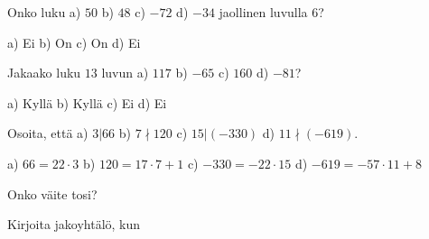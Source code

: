 \begin{tehtavasivu}

\begin{tehtava}
    Onko luku a) $50$ b) $48$ c) $-72$ d) $-34$ jaollinen luvulla $6$?
    \begin{vastaus}
        a) Ei b) On c) On d) Ei
    \end{vastaus}

\end{tehtava}

\begin{tehtava}
    Jakaako luku $13$ luvun a) $117$ b) $-65$ c) $160$ d) $-81$?
    \begin{vastaus}
        a) Kyllä b) Kyllä c) Ei d) Ei 
    \end{vastaus}
\end{tehtava}

\begin{tehtava}
    Osoita, että a) $3|66$ b) $7\nmid 120$ c) $15|(-330)$ d) $11\nmid (-619)$.
    \begin{vastaus}
        a) $66 = 22\cdot 3$ b) $120 = 17\cdot 7 + 1$ c) $-330 = -22\cdot 15$ d) $-619 = -57\cdot 11 + 8$ 
    \end{vastaus}

\end{tehtava}

\begin{tehtava}
    Onko väite tosi?
    
    \begin{vastaus}
    \end{vastaus}
\end{tehtava}

\begin{tehtava}
    Kirjoita jakoyhtälö, kun
    
    \begin{vastaus}
    \end{vastaus}
\end{tehtava}


\end{tehtavasivu}
